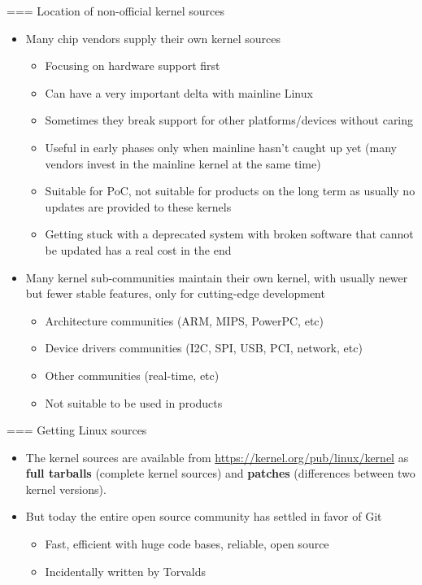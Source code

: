 === Location of non-official kernel sources
  \begin{itemize}
  \item Many chip vendors supply their own kernel sources
    \begin{itemize}
    \item Focusing on hardware support first
    \item Can have a very important delta with mainline Linux
    \item Sometimes they break support for other platforms/devices
      without caring
    \item Useful in early phases only when mainline hasn't caught up yet
      (many vendors invest in the mainline kernel at the same time)
    \item Suitable for PoC, not suitable for products on the long term
      as usually no updates are provided to these kernels
    \item Getting stuck with a deprecated system with broken software
      that cannot be updated has a real cost in the end
    \end{itemize}
  \item Many kernel sub-communities maintain their own kernel, with
    usually newer but fewer stable features, only for cutting-edge
    development
    \begin{itemize}
    \item Architecture communities (ARM, MIPS, PowerPC, etc)
    \item Device drivers communities (I2C, SPI, USB, PCI, network, etc)
    \item Other communities (real-time, etc)
    \item Not suitable to be used in products
    \end{itemize}
  \end{itemize}


=== Getting Linux sources
  \begin{itemize}
  \item The kernel sources are available from
    \url{https://kernel.org/pub/linux/kernel} as {\bf full tarballs}
    (complete kernel sources) and {\bf patches} (differences between
    two kernel versions).
  \item But today the entire open source community has settled in favor
    of Git
    \begin{itemize}
    \item Fast, efficient with huge code bases, reliable, open source
    \item Incidentally written by Torvalds
    \end{itemize}
  \end{itemize}


